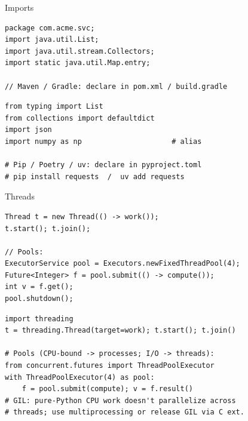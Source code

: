 \documentclass[10pt]{article}
\begin{document}
\begin{construct}{Imports}
\noindent
\begin{minipage}[t]{0.485\linewidth}
\begin{lstlisting}[style=java, title=Java]
package com.acme.svc;
import java.util.List;
import java.util.stream.Collectors;
import static java.util.Map.entry;

// Maven / Gradle: declare in pom.xml / build.gradle
\end{lstlisting}
\end{minipage}\hfill
\begin{minipage}[t]{0.485\linewidth}
\begin{lstlisting}[style=python, title=Python]
from typing import List
from collections import defaultdict
import json
import numpy as np                     # alias

# Pip / Poetry / uv: declare in pyproject.toml
# pip install requests  /  uv add requests
\end{lstlisting}
\end{minipage}
\end{construct}


\begin{construct}{Threads}
\noindent
\begin{minipage}[t]{0.485\linewidth}
\begin{lstlisting}[style=java, title=Java]
Thread t = new Thread(() -> work());
t.start(); t.join();

// Pools:
ExecutorService pool = Executors.newFixedThreadPool(4);
Future<Integer> f = pool.submit(() -> compute());
int v = f.get();
pool.shutdown();
\end{lstlisting}
\end{minipage}\hfill
\begin{minipage}[t]{0.485\linewidth}
\begin{lstlisting}[style=python, title=Python]
import threading
t = threading.Thread(target=work); t.start(); t.join()

# Pools (CPU-bound -> processes; I/O -> threads):
from concurrent.futures import ThreadPoolExecutor
with ThreadPoolExecutor(4) as pool:
    f = pool.submit(compute); v = f.result()
# GIL: pure-Python CPU work doesn't parallelize across
# threads; use multiprocessing or release GIL via C ext.
\end{lstlisting}
\end{minipage}
\end{construct}
\end{document}
